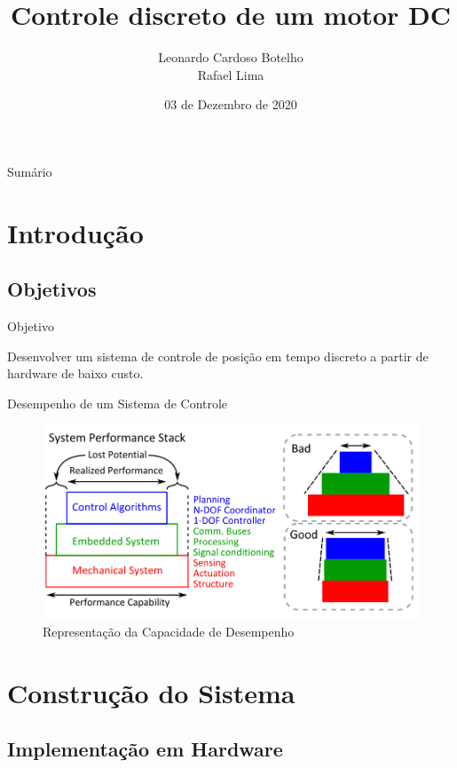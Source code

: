 \documentclass{beamer}
\title{Controle discreto de um motor DC}
\date{03 de Dezembro de 2020}
\author{Leonardo Cardoso Botelho \\ Rafael Lima}
\institute{Universidade de Brasília}
\begin{document}
\maketitle
\begin{frame}{Sumário}
\tableofcontents
\end{frame}

\section{Introdução}
\subsection{Objetivos}

\begin{frame}{Objetivo}

\begin{block}{}
Desenvolver um sistema de controle de posição em tempo discreto a partir de hardware de baixo custo.
\end{block}

\end{frame}

\begin{frame}{Desempenho de um Sistema de Controle}
\begin{figure}
    \centering
    \includegraphics[width = 0.9\linewidth]{src/tex/img/system_perfomance.png}
    \caption{Representação da Capacidade de Desempenho \cite{paine2014high}}
    \label{fig:system_perfomance}
\end{figure}
\end{frame}

\section{Construção do Sistema}

\subsection{Implementação em Hardware}
\end{document}
